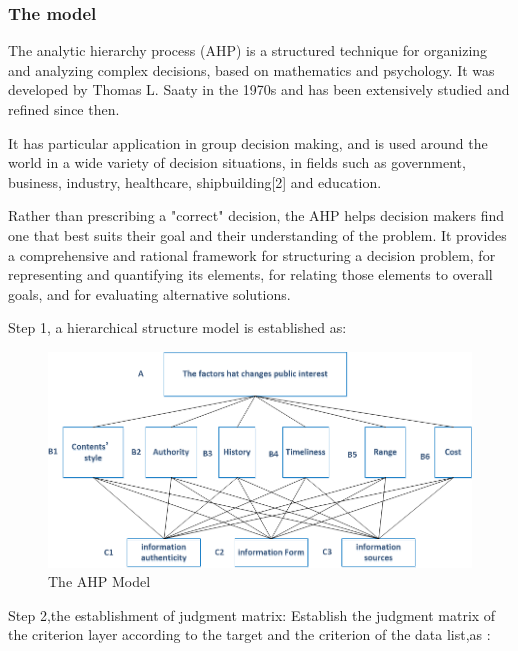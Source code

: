 \subsubsection *{The model}
\par The analytic hierarchy process (AHP) is a structured technique for organizing and analyzing complex decisions, based on mathematics and psychology. It was developed by Thomas L. Saaty in the 1970s and has been extensively studied and refined since then.
\par It has particular application in group decision making, and is used around the world in a wide variety of decision situations, in fields such as government, business, industry, healthcare, shipbuilding[2] and education.
\par Rather than prescribing a "correct" decision, the AHP helps decision makers find one that best suits their goal and their understanding of the problem. It provides a comprehensive and rational framework for structuring a decision problem, for representing and quantifying its elements, for relating those elements to overall goals, and for evaluating alternative solutions.
\par Step 1, a hierarchical structure model is established as:
\begin{figure}[h]
	\small
	\centering
	\includegraphics[width=15cm]{./picture/cengci.png}
	\caption{The AHP Model}
	\label{fig:The AHP Model}
\end{figure}

\par Step 2,the establishment of judgment matrix:
Establish the judgment matrix of the criterion layer according to the target and the criterion of the data list,as :

